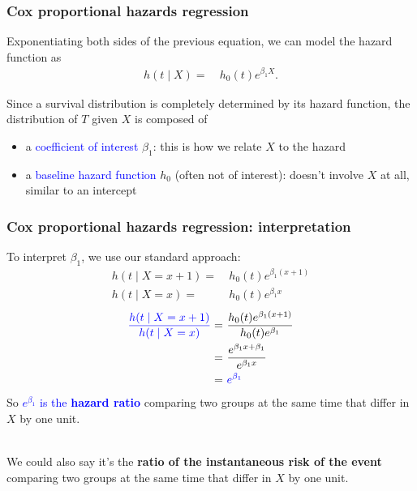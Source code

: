 \documentclass[10pt,t]{beamer}
\begin{document}
\begin{frame}
\frametitle{Cox proportional hazards regression}
Exponentiating both sides of the previous equation, we can model the hazard function as
\begin{align*}
h(t \mid X) = & \ h_0(t)e^{\beta_1 X}.
\end{align*}

Since a survival distribution is completely determined by its hazard function, the distribution of $T$ given $X$ is composed of

\medskip

\begin{itemize}
\item a \textcolor{blue}{coefficient of interest} $\beta_1$: this is how we relate $X$ to the hazard

\medskip
\item a \textcolor{blue}{baseline hazard function} $h_0$ (often not of interest): doesn't involve $X$ at all, similar to an intercept
\end{itemize}
\end{frame}

\begin{frame}
\frametitle{Cox proportional hazards regression: interpretation}
\vspace{-0.5cm}
To interpret $\beta_1$, we use our standard approach: 
\begin{align*}
h(t \mid X = x + 1) = & \ h_0(t)e^{\beta_1 (x + 1)}\\
h(t \mid X = x) = & \ h_0(t)e^{\beta_1 x} 
\end{align*}  \vspace{-0.3cm}
\begin{align*}
\textcolor{blue}{\frac{h(t \mid X = x + 1)}{h(t \mid X = x)}} = & \ \frac{h_0(t)e^{\beta_1 (x + 1)}}{h_0(t)e^{\beta_1}} \\
=& \ \frac{e^{\beta_1x + \beta_1}}{e^{\beta_1 x}} \\
=& \ \textcolor{blue}{e^{\beta_1 }}
\end{align*}
So \textcolor{blue}{$e^{\beta_1}$ is the \textbf{hazard ratio}} comparing two groups at the same time that differ in $X$ by one unit. 
\\ ~\ 

We could also say it's the  \textbf{ratio of the instantaneous risk of the event} comparing two groups at the same time that differ in $X$ by one unit.
\end{frame}
\end{document}
